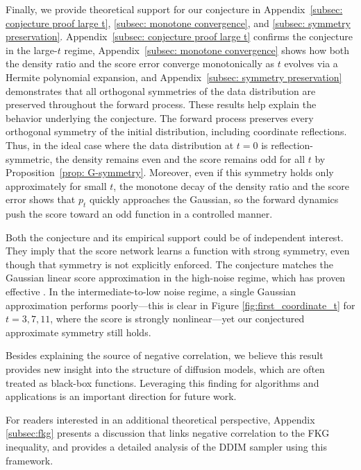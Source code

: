\documentclass[12pt]{article}
\newcommand{\0}{\mathbf{0}}
\begin{document}
Finally, we provide theoretical support for our conjecture in Appendix~\ref{subsec: conjecture proof large t}, \ref{subsec: monotone convergence}, and \ref{subsec: symmetry preservation}. Appendix~\ref{subsec: conjecture proof large t} confirms the conjecture in the large-$t$ regime, Appendix~\ref{subsec: monotone convergence} shows how both the density ratio and the score error converge monotonically as $t$ evolves via a Hermite polynomial expansion, and Appendix~\ref{subsec: symmetry preservation} demonstrates that all orthogonal symmetries of the data distribution are preserved throughout the forward process. These results help explain the behavior underlying the conjecture. The forward process preserves every orthogonal symmetry of the initial distribution, including coordinate reflections. Thus, in the ideal case where the data distribution at $t = 0$ is reflection-symmetric, the density remains even and the score remains odd for all $t$ by Proposition~\ref{prop: G-symmetry}. Moreover, even if this symmetry holds only approximately for small $t$, the monotone decay of the density ratio and the score error shows that $p_t$ quickly approaches the Gaussian, so the forward dynamics push the score toward an odd function in a controlled manner.

 


Both the conjecture and its empirical support could be of independent interest. They imply that the score network learns a function with strong symmetry, even though that symmetry is not explicitly enforced. The conjecture matches the Gaussian linear score approximation in the high-noise regime, which has proven effective \citep{wang2024the}. In the intermediate-to-low noise regime, a single Gaussian approximation performs poorly—this is clear in Figure \ref{fig:first_coordinate_t} for $t = 3, 7, 11$, where the score is strongly nonlinear—yet our conjectured approximate symmetry still holds. 

Besides explaining the source of negative correlation, we believe this result provides new insight into the structure of diffusion models, which are often treated as black-box functions. Leveraging this finding for algorithms and applications is an important direction for future work.

For readers interested in an additional theoretical perspective, Appendix \ref{subsec:fkg} presents a discussion that links negative correlation to the FKG inequality,  and provides a detailed analysis of the DDIM sampler using this framework.
\end{document}
